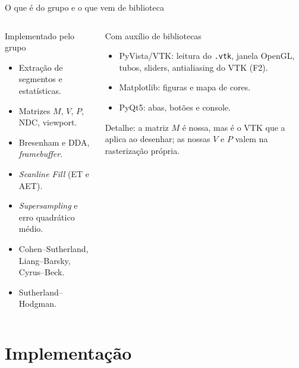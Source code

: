 \documentclass[aspectratio=169,11pt]{beamer}
\begin{document}
\begin{frame}{O que é do grupo e o que vem de biblioteca}
\begin{columns}[T]
\begin{block}{Implementado pelo grupo}
\small
\begin{itemize}
  \item Extração de segmentos e estatísticas.
  \item Matrizes $M$, $V$, $P$, NDC, viewport.
  \item Bresenham e DDA, \emph{framebuffer}.
  \item \emph{Scanline Fill} (ET e AET).
  \item \emph{Supersampling} e erro quadrático médio.
  \item Cohen--Sutherland, Liang--Barsky, Cyrus--Beck.
  \item Sutherland--Hodgman.
\end{itemize}
\end{block}
\begin{block}{Com auxílio de bibliotecas}
\small
\begin{itemize}
  \item PyVista/VTK: leitura do \texttt{.vtk}, janela OpenGL, tubos, sliders, antialiasing do VTK (F2).
  \item Matplotlib: figuras e mapa de cores.
  \item PyQt5: abas, botões e console.
\end{itemize}
\vspace{0.1cm}
\footnotesize
\textcolor{ufopred}{Detalhe:} a matriz $M$ é nossa, mas é o VTK que a aplica ao desenhar; as nossas $V$ e $P$ valem na rasterização própria.
\end{block}
\end{columns}
\end{frame}

\section{Implementação}
\end{document}
